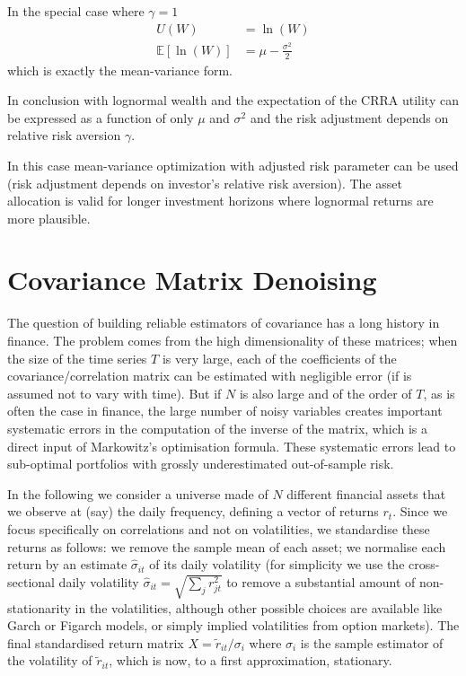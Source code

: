 In the special case where $\gamma=1$
\begin{align*}
U(W) &= \ln(W) \\
\mathbb{E}[\ln(W)] &= \mu - \frac{\sigma^2}{2}
\end{align*}
which is exactly the mean-variance form.

In conclusion with lognormal wealth and the expectation of the CRRA utility can be expressed as a function of only $\mu$ and $\sigma^2$ and the risk adjustment depends on relative risk aversion $\gamma$.

In this case mean-variance optimization with adjusted risk parameter can be used (risk adjustment depends on investor's relative risk aversion). The asset allocation is valid for longer investment horizons where lognormal returns are more plausible.

\section{Covariance Matrix Denoising}

The question of building reliable estimators of covariance has a long history in finance. The problem comes from the high dimensionality of these matrices; when the size of the time series $T$ is very large, each of the coefficients of the covariance/correlation matrix can be estimated with negligible error (if is assumed not to vary with time). But if $N$ is also large and of the order of $T$, as is often the case in finance, the large number of noisy variables creates important systematic errors in the computation of the inverse of the matrix, which is a direct input of Markowitz’s optimisation formula. These systematic errors lead to sub-optimal portfolios with grossly underestimated out-of-sample risk.

In the following we consider a universe made of $N$ different financial assets that we observe at (say) the daily frequency, defining a vector of returns $r_t$. Since we focus specifically on correlations and not on volatilities, we standardise these returns as follows: we remove the sample mean of each asset; we normalise each return by an estimate $\hat{\sigma}_{it}$ of its daily volatility (for simplicity we use the cross-sectional daily volatility $\hat{\sigma}_{it}=\sqrt{\sum_j r_{jt}^2}$ to remove a substantial amount of non-stationarity in the volatilities, although other possible choices are available like Garch or Figarch models, or simply implied volatilities from option markets). The final standardised return matrix $X = \tilde{r}_{it}/\sigma_i$ where $\sigma_i$ is the sample estimator of the volatility of $\tilde{r}_{it}$, which is now, to a first approximation, stationary.

